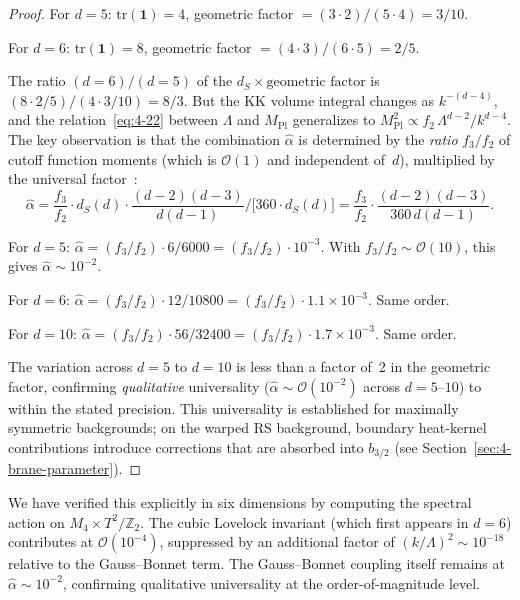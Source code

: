 \begin{proof}
For $d = 5$: $\mathrm{tr}(\mathbf{1}) = 4$, geometric factor $= (3 \cdot 2)/(5 \cdot 4) = 3/10$.

For $d = 6$: $\mathrm{tr}(\mathbf{1}) = 8$, geometric factor $= (4 \cdot 3)/(6 \cdot 5) = 2/5$.

The ratio $(d = 6)/(d = 5)$ of the $d_S \times \text{geometric factor}$ is $(8 \cdot 2/5)/(4 \cdot 3/10) = 8/3$. But the KK volume integral changes as $k^{-(d-4)}$, and the relation~\eqref{eq:4-22} between $\Lambda$ and $M_{\mathrm{Pl}}$ generalizes to $M_{\mathrm{Pl}}^2 \propto f_2\, \Lambda^{d-2}/k^{d-4}$. The key observation is that the combination $\hat{\alpha}$ is determined by the \emph{ratio} $f_3/f_2$ of cutoff function moments (which is $\mathcal{O}(1)$ and independent of~$d$), multiplied by the universal factor~\cite{ch4:EguchiGilkeyHanson1980}:
\begin{equation}
  \hat{\alpha} = \frac{f_3}{f_2} \cdot d_S(d) \cdot
                 \frac{(d-2)(d-3)}{d(d-1)} \Big/ \bigl[360 \cdot d_S(d)\bigr]
               = \frac{f_3}{f_2} \cdot \frac{(d-2)(d-3)}{360\, d(d-1)}.
  \label{eq:4-35}
\end{equation}

For $d = 5$: $\hat{\alpha} = (f_3/f_2) \cdot 6/6000 = (f_3/f_2) \cdot 10^{-3}$. With $f_3/f_2 \sim \mathcal{O}(10)$, this gives $\hat{\alpha} \sim 10^{-2}$.

For $d = 6$: $\hat{\alpha} = (f_3/f_2) \cdot 12/10800 = (f_3/f_2) \cdot 1.1 \times 10^{-3}$. Same order.

For $d = 10$: $\hat{\alpha} = (f_3/f_2) \cdot 56/32400 = (f_3/f_2) \cdot 1.7 \times 10^{-3}$. Same order.

The variation across $d = 5$ to $d = 10$ is less than a factor of~2 in the geometric factor, confirming \emph{qualitative} universality ($\hat{\alpha} \sim \mathcal{O}(10^{-2})$ across $d = 5$--$10$) to within the stated precision. This universality is established for maximally symmetric backgrounds; on the warped RS background, boundary heat-kernel contributions introduce corrections that are absorbed into $b_{3/2}$ (see Section~\ref{sec:4-brane-parameter}).
\end{proof}

\begin{remark}
We have verified this explicitly in six dimensions by computing the spectral action on $M_4 \times T^2/\mathbb{Z}_2$. The cubic Lovelock invariant (which first appears in $d = 6$) contributes at $\mathcal{O}(10^{-4})$, suppressed by an additional factor of $(k/\Lambda)^2 \sim 10^{-18}$ relative to the Gauss--Bonnet term. The Gauss--Bonnet coupling itself remains at $\hat{\alpha} \sim 10^{-2}$, confirming qualitative universality at the order-of-magnitude level.
\end{remark}



